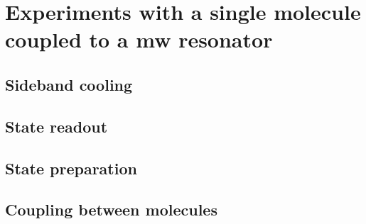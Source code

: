 \section{Experiments with a single molecule coupled to a mw resonator}

\subsection{Sideband cooling}

\subsection{State readout}

\subsection{State preparation}


\subsection{Coupling between molecules}



